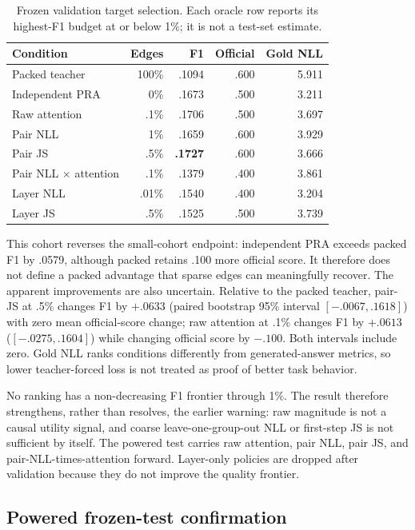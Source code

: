 \documentclass[11pt]{article}
\begin{document}
\begin{table}[ht]
\centering
\small
\caption{Frozen validation target selection. Each oracle row reports its
highest-F1 budget at or below 1\%; it is not a test-set estimate.}
\label{tab:interventional-validation}
\begin{tabular}{lrrrr}
\toprule
Condition & Edges & F1 & Official & Gold NLL \\
\midrule
Packed teacher & 100\% & .1094 & .600 & 5.911 \\
Independent PRA & 0\% & .1673 & .500 & 3.211 \\
Raw attention & .1\% & .1706 & .500 & 3.697 \\
Pair NLL & 1\% & .1659 & .600 & 3.929 \\
Pair JS & .5\% & \textbf{.1727} & .600 & 3.666 \\
Pair NLL $\times$ attention & .1\% & .1379 & .400 & 3.861 \\
Layer NLL & .01\% & .1540 & .400 & 3.204 \\
Layer JS & .5\% & .1525 & .500 & 3.739 \\
\bottomrule
\end{tabular}
\end{table}

This cohort reverses the small-cohort endpoint: independent PRA exceeds packed
F1 by .0579, although packed retains .100 more official score. It therefore
does not define a packed advantage that sparse edges can meaningfully recover.
The apparent improvements are also uncertain. Relative to the packed teacher,
pair-JS at .5\% changes F1 by $+.0633$ (paired bootstrap 95\% interval
$[-.0067,.1618]$) with zero mean official-score change; raw attention at .1\%
changes F1 by $+.0613$ ($[-.0275,.1604]$) while changing official score by
$-.100$. Both intervals include zero. Gold NLL ranks conditions differently
from generated-answer metrics, so lower teacher-forced loss is not treated as
proof of better task behavior.

No ranking has a non-decreasing F1 frontier through 1\%. The result therefore
strengthens, rather than resolves, the earlier warning: raw magnitude is not
a causal utility signal, and coarse leave-one-group-out NLL or first-step JS is
not sufficient by itself. The powered test carries raw attention, pair NLL,
pair JS, and pair-NLL-times-attention forward. Layer-only policies are dropped
after validation because they do not improve the quality frontier.

\subsection{Powered frozen-test confirmation}
\end{document}
